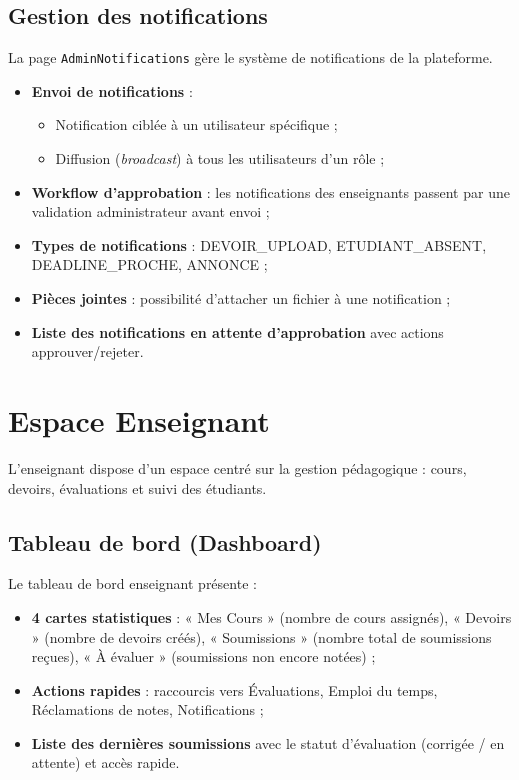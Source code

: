 \subsection{Gestion des notifications}

La page \texttt{AdminNotifications} gère le système de notifications de la plateforme.

\begin{itemize}[noitemsep]
    \item \textbf{Envoi de notifications} :
    \begin{itemize}[noitemsep]
        \item Notification ciblée à un utilisateur spécifique ;
        \item Diffusion (\textit{broadcast}) à tous les utilisateurs d'un rôle ;
    \end{itemize}
    \item \textbf{Workflow d'approbation} : les notifications des enseignants passent par une validation administrateur avant envoi ;
    \item \textbf{Types de notifications} : DEVOIR\_UPLOAD, ETUDIANT\_ABSENT, DEADLINE\_PROCHE, ANNONCE ;
    \item \textbf{Pièces jointes} : possibilité d'attacher un fichier à une notification ;
    \item \textbf{Liste des notifications en attente d'approbation} avec actions approuver/rejeter.
\end{itemize}

\section{Espace Enseignant}

L'enseignant dispose d'un espace centré sur la gestion pédagogique : cours, devoirs, évaluations et suivi des étudiants.

\subsection{Tableau de bord (Dashboard)}

Le tableau de bord enseignant présente :
\begin{itemize}[noitemsep]
    \item \textbf{4 cartes statistiques} : « Mes Cours » (nombre de cours assignés), « Devoirs » (nombre de devoirs créés), « Soumissions » (nombre total de soumissions reçues), « À évaluer » (soumissions non encore notées) ;
    \item \textbf{Actions rapides} : raccourcis vers Évaluations, Emploi du temps, Réclamations de notes, Notifications ;
    \item \textbf{Liste des dernières soumissions} avec le statut d'évaluation (corrigée / en attente) et accès rapide.
\end{itemize}

